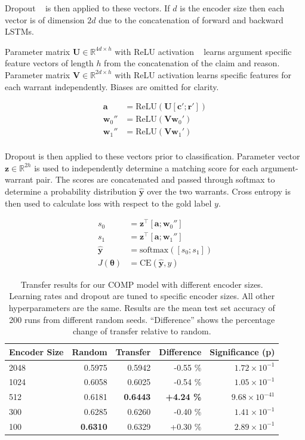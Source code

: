 \documentclass[11pt,a4paper]{article}
\begin{document}
\noindent
Dropout ~\cite{JMLR:v15:srivastava14a} is then applied to these vectors.
If $d$ is the encoder size then each vector is of dimension $2d$
  due to the concatenation of forward and backward LSTMs.

Parameter matrix $\mathbf{U} \in \mathbb{R}^{4d \times h}$ with ReLU activation ~\cite{Nair2010RectifiedLU}
  learns argument specific feature vectors of length $h$ from the concatenation of the claim and reason.
Parameter matrix $\mathbf{V} \in \mathbb{R}^{2d \times h}$ with ReLU activation
  learns specific features for each warrant independently.
Biases are omitted for clarity.

\begin{align*}
\mathbf{a} &= \text{ReLU}(\mathbf{U} [\mathbf{c}' ; \mathbf{r}']) \\
\mathbf{w}_0'' &= \text{ReLU}(\mathbf{V}\mathbf{w}_0') \\
\mathbf{w}_1'' &= \text{ReLU}(\mathbf{V}\mathbf{w}_1') \\
\end{align*}

\noindent
Dropout is then applied to these vectors prior to classification.
Parameter vector $\mathbf{z} \in \mathbb{R}^{2h}$ is used to independently determine a matching score for each argument-warrant pair.
The scores are concatenated and passed through softmax to determine a probability distribution $\hat{\mathbf{y}}$ over the two warrants.
Cross entropy is then used to calculate loss with respect to the gold label $y$.


\begin{align*}
s_0 &= \mathbf{z}^\top [\mathbf{a} ; \mathbf{w}_0''] \\
s_1 &= \mathbf{z}^\top [\mathbf{a} ; \mathbf{w}_1''] \\
\hat{\mathbf{y}} &= \text{softmax}([s_0 ; s_1]) \\
J(\mathbf{\theta}) &= \text{CE}(\hat{\mathbf{y}}, y)
\end{align*}

\begin{table}[t]
\centering
\begin{tabular}{lrrrr}
  \bf Encoder Size  & \bf Random & \bf Transfer & \bf Difference & \bf Significance (p) \\
  \hline
  2048 & 0.5975 & 0.5942 & -0.55 \% & $1.72 \times 10^{-1}$ \\
  1024 & 0.6058 & 0.6025 & -0.54 \% & $1.05 \times 10^{-1}$ \\
  512  & 0.6181 & \bf 0.6443 & \bf +4.24 \% & $9.68 \times 10^{-41}$ \\
  300  & 0.6285 & 0.6260 & -0.40 \% & $1.41 \times 10^{-1}$ \\
  100  & \bf 0.6310 & 0.6329 & +0.30 \% & $2.89 \times 10^{-1}$  \\
\end{tabular}
\caption{Transfer results for our COMP model with different encoder sizes.
Learning rates and dropout are tuned to specific encoder sizes.
All other hyperparameters are the same.
Results are the mean test set accuracy of 200 runs from different random seeds.
``Difference'' shows the percentage change of transfer relative to random.}
\end{table}
\end{document}
